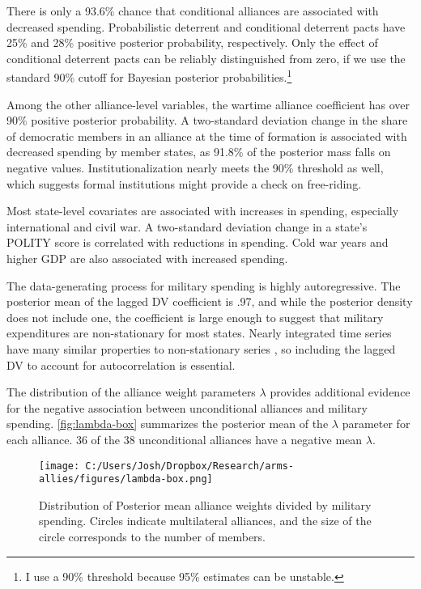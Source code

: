 \documentclass[12pt]{article}
\begin{document}
There is only a 93.6\% chance that conditional alliances are associated with decreased spending. Probabilistic deterrent and conditional deterrent pacts have 25\% and 28\% positive posterior probability, respectively. Only the effect of conditional deterrent pacts can be reliably distinguished from zero, if we use the standard 90\% cutoff for Bayesian posterior probabilities.\footnote{I use a 90\% threshold because 95\% estimates can be unstable.}

Among the other alliance-level variables, the wartime alliance coefficient has over 90\% positive posterior probability. A two-standard deviation change in the share of democratic members in an alliance at the time of formation is associated with decreased spending by member states, as 91.8\% of the posterior mass falls on negative values. Institutionalization nearly meets the 90\% threshold as well, which suggests formal institutions might provide a check on free-riding. 

Most state-level covariates are associated with increases in spending, especially international and civil war. A two-standard deviation change in a state's POLITY score is correlated with reductions in spending. Cold war years and higher GDP are also associated with increased spending.

The data-generating process for military spending is highly autoregressive. The posterior mean of the lagged DV coefficient is .97, and while the posterior density does not include one, the coefficient is large enough to suggest that military expenditures are non-stationary for most states. Nearly integrated time series have many similar properties to non-stationary series \citep{DeBoefGranato1997}, so including the lagged DV to account for autocorrelation is essential. 

The distribution of the alliance weight parameters $\lambda$ provides additional evidence for the negative association between unconditional alliances and military spending. \autoref{fig:lambda-box} summarizes the posterior mean of the $\lambda$ parameter for each alliance. 36 of the 38 unconditional alliances have a negative mean $\lambda$.  

\begin{figure}[htbp]
	\centering
		\texttt{[image: C:/Users/Josh/Dropbox/Research/arms-allies/figures/lambda-box.png]}
	\caption{Distribution of Posterior mean alliance weights divided by military spending. Circles indicate multilateral alliances, and the size of the circle corresponds to the number of members.}
	\label{fig:lambda-box}
\end{figure}
\end{document}
